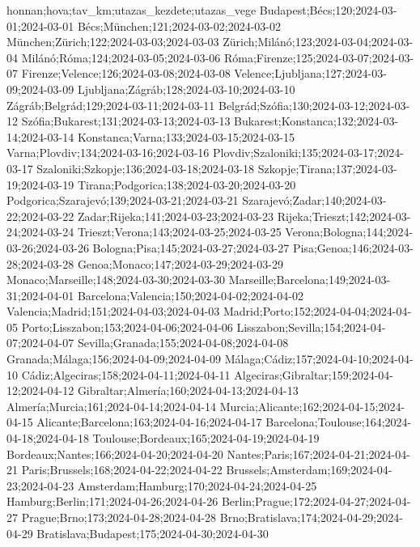 honnan;hova;tav_km;utazas_kezdete;utazas_vege
Budapest;Bécs;120;2024-03-01;2024-03-01
Bécs;München;121;2024-03-02;2024-03-02
München;Zürich;122;2024-03-03;2024-03-03
Zürich;Milánó;123;2024-03-04;2024-03-04
Milánó;Róma;124;2024-03-05;2024-03-06
Róma;Firenze;125;2024-03-07;2024-03-07
Firenze;Velence;126;2024-03-08;2024-03-08
Velence;Ljubljana;127;2024-03-09;2024-03-09
Ljubljana;Zágráb;128;2024-03-10;2024-03-10
Zágráb;Belgrád;129;2024-03-11;2024-03-11
Belgrád;Szófia;130;2024-03-12;2024-03-12
Szófia;Bukarest;131;2024-03-13;2024-03-13
Bukarest;Konstanca;132;2024-03-14;2024-03-14
Konstanca;Varna;133;2024-03-15;2024-03-15
Varna;Plovdiv;134;2024-03-16;2024-03-16
Plovdiv;Szaloniki;135;2024-03-17;2024-03-17
Szaloniki;Szkopje;136;2024-03-18;2024-03-18
Szkopje;Tirana;137;2024-03-19;2024-03-19
Tirana;Podgorica;138;2024-03-20;2024-03-20
Podgorica;Szarajevó;139;2024-03-21;2024-03-21
Szarajevó;Zadar;140;2024-03-22;2024-03-22
Zadar;Rijeka;141;2024-03-23;2024-03-23
Rijeka;Trieszt;142;2024-03-24;2024-03-24
Trieszt;Verona;143;2024-03-25;2024-03-25
Verona;Bologna;144;2024-03-26;2024-03-26
Bologna;Pisa;145;2024-03-27;2024-03-27
Pisa;Genoa;146;2024-03-28;2024-03-28
Genoa;Monaco;147;2024-03-29;2024-03-29
Monaco;Marseille;148;2024-03-30;2024-03-30
Marseille;Barcelona;149;2024-03-31;2024-04-01
Barcelona;Valencia;150;2024-04-02;2024-04-02
Valencia;Madrid;151;2024-04-03;2024-04-03
Madrid;Porto;152;2024-04-04;2024-04-05
Porto;Lisszabon;153;2024-04-06;2024-04-06
Lisszabon;Sevilla;154;2024-04-07;2024-04-07
Sevilla;Granada;155;2024-04-08;2024-04-08
Granada;Málaga;156;2024-04-09;2024-04-09
Málaga;Cádiz;157;2024-04-10;2024-04-10
Cádiz;Algeciras;158;2024-04-11;2024-04-11
Algeciras;Gibraltar;159;2024-04-12;2024-04-12
Gibraltar;Almería;160;2024-04-13;2024-04-13
Almería;Murcia;161;2024-04-14;2024-04-14
Murcia;Alicante;162;2024-04-15;2024-04-15
Alicante;Barcelona;163;2024-04-16;2024-04-17
Barcelona;Toulouse;164;2024-04-18;2024-04-18
Toulouse;Bordeaux;165;2024-04-19;2024-04-19
Bordeaux;Nantes;166;2024-04-20;2024-04-20
Nantes;Paris;167;2024-04-21;2024-04-21
Paris;Brussels;168;2024-04-22;2024-04-22
Brussels;Amsterdam;169;2024-04-23;2024-04-23
Amsterdam;Hamburg;170;2024-04-24;2024-04-25
Hamburg;Berlin;171;2024-04-26;2024-04-26
Berlin;Prague;172;2024-04-27;2024-04-27
Prague;Brno;173;2024-04-28;2024-04-28
Brno;Bratislava;174;2024-04-29;2024-04-29
Bratislava;Budapest;175;2024-04-30;2024-04-30